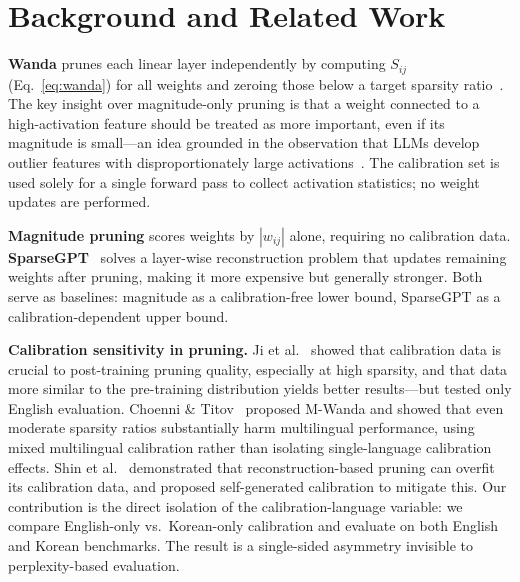 \documentclass{article}
\begin{document}
\section{Background and Related Work}
\label{sec:background}

\textbf{Wanda} prunes each linear layer independently by computing $S_{ij}$ (Eq.~\ref{eq:wanda}) for all weights and zeroing those below a target sparsity ratio~\citep{sun2024wanda}.
The key insight over magnitude-only pruning is that a weight connected to a high-activation feature should be treated as more important, even if its magnitude is small---an idea grounded in the observation that LLMs develop outlier features with disproportionately large activations~\citep{dettmers2022llmint8}.
The calibration set is used solely for a single forward pass to collect activation statistics; no weight updates are performed.

\textbf{Magnitude pruning} scores weights by $|w_{ij}|$ alone, requiring no calibration data.
\textbf{SparseGPT}~\citep{frantar2023sparsegpt} solves a layer-wise reconstruction problem that updates remaining weights after pruning, making it more expensive but generally stronger.
Both serve as baselines: magnitude as a calibration-free lower bound, SparseGPT as a calibration-dependent upper bound.

\textbf{Calibration sensitivity in pruning.}
Ji et al.~\citep{ji2025calibration} showed that calibration data is crucial to post-training pruning quality, especially at high sparsity, and that data more similar to the pre-training distribution yields better results---but tested only English evaluation.
Choenni \& Titov~\citep{choenni2025multilingual} proposed M-Wanda and showed that even moderate sparsity ratios substantially harm multilingual performance, using mixed multilingual calibration rather than isolating single-language calibration effects.
Shin et al.~\citep{shin2024calibration} demonstrated that reconstruction-based pruning can overfit its calibration data, and proposed self-generated calibration to mitigate this.
Our contribution is the direct isolation of the calibration-language variable: we compare English-only vs.\ Korean-only calibration and evaluate on both English and Korean benchmarks.
The result is a single-sided asymmetry invisible to perplexity-based evaluation.

\end{document}
